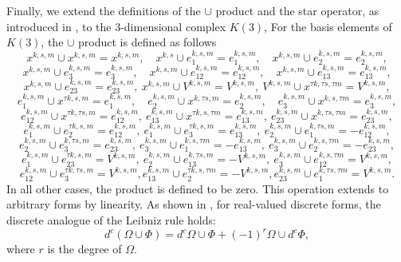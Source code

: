 \documentclass[english]{article}
\theoremstyle{plain}
\theoremstyle{definition}
\theoremstyle{remark}
\numberwithin{equation}{section}
\begin{document}
 Finally, we extend the definitions of the $\cup$ product and the star operator, as introduced in \cite{S5}, to the 3-dimensional complex
 $K(3)$,
 For the basis elements of $K(3)$, the $\cup$ product is defined as follows
\begin{equation*}\label{}
x^{k,s,m}\cup x^{k,s,m}=x^{k,s,m}, \quad x^{k,s}\cup e^{k,s,m}_1=e^{k,s,m}_1, \quad x^{k,s,m}\cup e^{k,s,m}_2=e^{k,s,m}_2,
\end{equation*}
\begin{equation*}\label{}
x^{k,s,m}\cup e^{k,s,m}_3=e^{k,s,m}_3, \quad x^{k,s,m}\cup e^{k,s,m}_{12}=e^{k,s,m}_{12}, \quad x^{k,s,m}\cup e^{k,s,m}_{13}=e^{k,s,m}_{13},
\end{equation*}
\begin{equation*}\label{}
x^{k,s,m}\cup e^{k,s,m}_{23}=e^{k,s,m}_{23}, \ x^{k,s,m}\cup V^{k,s,m}=V^{k,s,m}, \  V^{k,s,m}\cup x^{\tau k,\tau s, \tau m}=V^{k,s,m},
\end{equation*}
\begin{equation*}\label{}
e^{k,s,m}_1\cup x^{\tau k,s,m}=e^{k,s,m}_1, \quad e^{k,s,m}_2\cup x^{k,\tau s,m}=e^{k,s,m}_2, \quad e^{k,s,m}_3\cup x^{k,s,\tau m}=e^{k,s,m}_3,
 \end{equation*}
\begin{equation*}\label{}
e^{k,s,m}_{12}\cup x^{\tau k,\tau s,m}=e^{k,s,m}_{12}, \ e^{k,s,m}_{13}\cup x^{\tau k, s,\tau m}=e^{k,s,m}_{13}, \ e^{k,s,m}_{23}\cup x^{k,\tau s,\tau m}=e^{k,s,m}_{23},
 \end{equation*}
\begin{equation*}\label{}
e^{k,s,m}_1\cup e^{\tau k,s,m}_2=e^{k,s,m}_{12}, \ e^{k,s,m}_1\cup e^{\tau k,s,m}_3=e^{k,s,m}_{13}, \
e^{k,s,m}_2\cup e^{k, \tau s,m}_1=-e^{k,s,m}_{12},
\end{equation*}
\begin{equation*}\label{}
e^{k,s,m}_2\cup e^{k, \tau s,m}_3=e^{k,s,m}_{23}, \ e^{k,s,m}_3\cup e^{k,s,\tau m}_1=-e^{k,s,m}_{13}, \
e^{k,s,m}_3\cup e^{k,s,\tau m}_2=-e^{k,s,m}_{23},
\end{equation*}
\begin{equation*}\label{}
e^{k,s,m}_1\cup e^{\tau k,s,m}_{23}=V^{k,s,m}, \ e^{k,s,m}_2\cup e^{k,\tau s,m}_{13}=-V^{k,s,m}, \
e^{k,s,m}_3\cup e^{k,s,\tau m}_{12}=V^{k,s,m},
\end{equation*}
\begin{equation*}\label{}
e^{k,s,m}_{12}\cup e^{\tau k,\tau s,m}_3=V^{k,s,m},  e^{k,s,m}_{13}\cup e^{\tau k, s,\tau m}_2=-V^{k,s,m},
e^{k,s,m}_{23}\cup e^{k,\tau s,\tau m}_1=V^{k,s,m}.
\end{equation*}
In all other cases, the product is defined to be zero.  This operation extends to arbitrary forms by linearity. As shown in \cite[Ch. 3, Proposition 2]{Dezin}, for real-valued discrete forms, the discrete analogue of the Leibniz rule holds:
\begin{equation}\label{2.11}
 d^c(\Omega\cup\Phi)=d^c \Omega\cup\Phi+(-1)^r\Omega\cup
d^c\Phi,
\end{equation}
where $r$ is the degree of $\Omega$.
\end{document}
